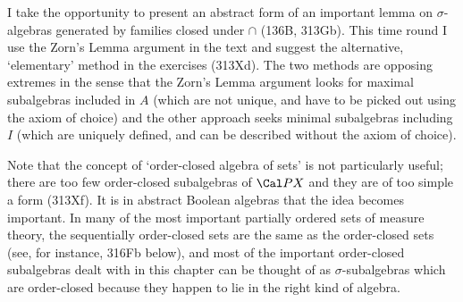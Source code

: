 {I take the opportunity to present an abstract form of an important lemma
on $\sigma$-algebras generated by families closed under $\cap$ (136B,
313Gb).   This time round I use the Zorn's Lemma argument in the text
and suggest the alternative, `elementary' method in the exercises
(313Xd).   The two methods are opposing extremes in the sense that the
Zorn's Lemma argument looks for maximal subalgebras included in $A$
(which are not unique, and have to be picked out using the axiom of
choice) and the other approach seeks minimal subalgebras including $I$
(which are uniquely defined, and can be described without the axiom of
choice).

Note that the concept of `order-closed algebra of sets' is not
particularly useful;  there are too few order-closed subalgebras of
$\Cal PX$ and they are of too simple a form (313Xf).   It is in abstract
Boolean algebras that the idea becomes important.   In
many of the most
important partially ordered sets of measure theory, the sequentially
order-closed sets are the same as the order-closed sets (see, for
instance, 316Fb below), and most of the important order-closed
subalgebras dealt with in this chapter can be thought of as
$\sigma$-subalgebras which are order-closed because they happen to lie
in the right kind of algebra.   

}%

\discrpage

